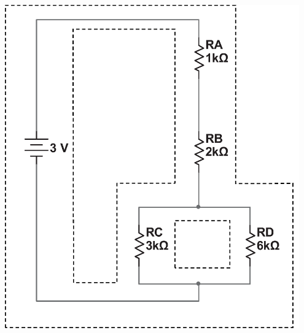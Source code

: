 \cleardoublepage %
\begin{center}
\includegraphics[width=0.95\textwidth]{electric_circuits2/cutout_page_bw.eps}
\end{center}

\newpage



